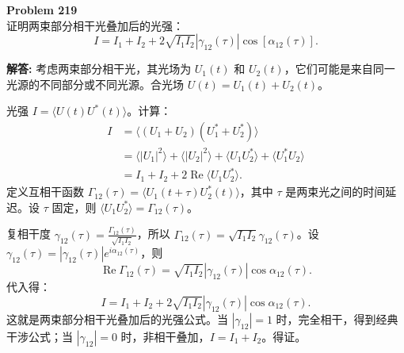 \documentclass[12pt, a4paper, oneside]{ctexart}
\newenvironment{solution}{\par\noindent\textbf{解答:}\quad}{\par}
\begin{document}
\begin{mdframed}[backgroundcolor=gray!10, linewidth=0pt]
    \textbf{Problem 219} \\
    证明两束部分相干光叠加后的光强：
    \[
    I = I_1 + I_2 + 2\sqrt{I_1 I_2} |\gamma_{12}(\tau)| \cos[\alpha_{12}(\tau)].
    \]
\end{mdframed}
\begin{solution}
    考虑两束部分相干光，其光场为 $U_1(t)$ 和 $U_2(t)$，它们可能是来自同一光源的不同部分或不同光源。合光场 $U(t) = U_1(t) + U_2(t)$。

    光强 $I = \langle U(t) U^*(t) \rangle$。计算：
    \begin{align*}
        I &= \langle (U_1+U_2)(U_1^*+U_2^*) \rangle \\
        &= \langle |U_1|^2 \rangle + \langle |U_2|^2 \rangle + \langle U_1 U_2^* \rangle + \langle U_1^* U_2 \rangle \\
        &= I_1 + I_2 + 2 \operatorname{Re} \langle U_1 U_2^* \rangle.
    \end{align*}
    定义互相干函数 $\Gamma_{12}(\tau) = \langle U_1(t+\tau) U_2^*(t) \rangle$，其中 $\tau$ 是两束光之间的时间延迟。设 $\tau$ 固定，则 $\langle U_1 U_2^* \rangle = \Gamma_{12}(\tau)$。

    复相干度 $\gamma_{12}(\tau) = \frac{\Gamma_{12}(\tau)}{\sqrt{I_1 I_2}}$，所以 $\Gamma_{12}(\tau) = \sqrt{I_1 I_2} \gamma_{12}(\tau)$。设 $\gamma_{12}(\tau) = |\gamma_{12}(\tau)| e^{i \alpha_{12}(\tau)}$，则
    \[
    \operatorname{Re} \Gamma_{12}(\tau) = \sqrt{I_1 I_2} |\gamma_{12}(\tau)| \cos \alpha_{12}(\tau).
    \]
    代入得：
    \[
    I = I_1 + I_2 + 2\sqrt{I_1 I_2} |\gamma_{12}(\tau)| \cos \alpha_{12}(\tau).
    \]
    这就是两束部分相干光叠加后的光强公式。当 $|\gamma_{12}|=1$ 时，完全相干，得到经典干涉公式；当 $|\gamma_{12}|=0$ 时，非相干叠加，$I = I_1 + I_2$。得证。
\end{solution}
\end{document}
